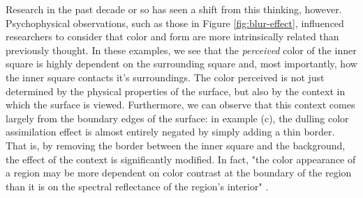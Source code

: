 \documentclass[journal,onecolumn]{IEEEtran}
\begin{document}
Research in the past decade or so has seen a shift from this thinking, however. Psychophysical observations, such as those in Figure \ref{fig:blur-effect}, influenced researchers to consider that color and form are more intrinsically related than previously thought. In these examples, we see that the \textit{perceived} color of the inner square is highly dependent on the surrounding square and, most importantly, how the inner square contacts it's surroundings. The color perceived is not just determined by the physical properties of the surface, but also by the context in which the surface is viewed. Furthermore, we can observe that this context comes largely from the boundary edges of the surface: in example (c), the dulling color assimilation effect is almost entirely negated by simply adding a thin border. That is, by removing the border between the inner square and the background, the effect of the context is significantly modified. In fact, "the color appearance of a region may be more dependent on color contrast at the boundary of the region than it is on the spectral reflectance of the region's interior" \cite[p.572]{chualupa:encyclopedia}.
\end{document}
